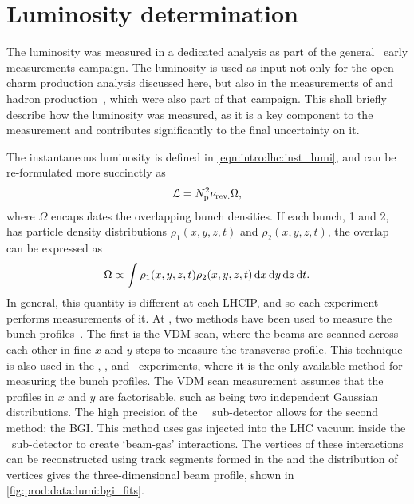 \section{Luminosity determination}
\label{chap:prod:data:lumi}

The luminosity was measured in a dedicated analysis as part of the general 
\lhcb\ early measurements campaign.
The luminosity is used as input not only for the open charm production analysis 
discussed here, but also in the measurements of \PJpsi and \PB hadron 
production~\cite{LHCb-PAPER-2015-037,LHCb-PAPER-2016-031}, which were also part 
of that campaign.
This  shall briefly describe how the luminosity 
was measured, as it is a key component to the measurement and contributes 
significantly to the final uncertainty on it.

The instantaneous luminosity is defined in \cref{eqn:intro:lhc:inst_lumi}, and 
can be re-formulated more succinctly as
\begin{equation}
  \mathcal{L} = N_{\text{p}}^{2}\nu_{\textnormal{rev.}}\Omega,
  \label{eqn:prod:data:lumi}
\end{equation}
where $\Omega$ encapsulates the overlapping bunch densities.
If each bunch, 1 and 2, has particle density distributions $\rho_{1}(x, y, z, 
t)$ and $\rho_{2}(x, y, z, t)$, the overlap can be expressed as
\begin{equation}
  \Omega \propto \int \rho_{1}(x, y, z, t)\rho_{2}(x, y, z, t)
                      \mathop{}\!\textnormal{d}{x}\mathop{}\!\textnormal{d}{y}\mathop{}\!\textnormal{d}{z}\mathop{}\!\textnormal{d}{t}.
  \label{eqn:prod:data:lumi:profile}
\end{equation}
In general, this quantity is different at each \acl{LHCIP}, and so each 
experiment performs measurements of it.
At \lhcb, two methods have been used to measure the bunch 
profiles~\cite{LHCb-PAPER-2014-047}.
The first is the \ac{VDM} scan, where the beams are scanned across each other 
in fine $x$ and $y$ steps to measure the transverse profile.
This technique is also used in the \atlas, \cms, and \alice\ experiments, where 
it is the only available method for measuring the bunch profiles.
The \ac{VDM} scan measurement assumes that the profiles in $x$ and $y$ are 
factorisable, such as being two independent Gaussian distributions.
The high precision of the \lhcb\ \velo\ sub-detector allows for the second 
method: the \ac{BGI}.
This method uses gas injected into the \ac{LHC} vacuum inside the \velo\ 
sub-detector to create `beam-gas' interactions.
The vertices of these interactions can be reconstructed using track segments 
formed in the \velo and the distribution of vertices gives the 
three-dimensional beam profile, shown in \cref{fig:prod:data:lumi:bgi_fits}.

